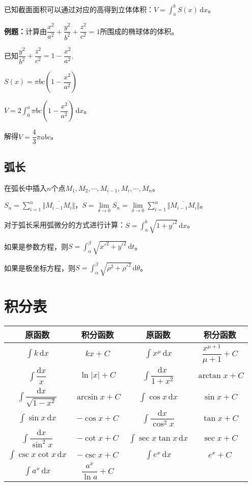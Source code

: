 \documentclass[UTF8, 12pt]{ctexart}
\begin{document}
已知截面面积可以通过对应的高得到立体体积：$V=\int_a^bS(x)\,\textrm{d}x$。

\textbf{例题：}计算由$\dfrac{x^2}{a^2}+\dfrac{y^2}{b^2}+\dfrac{z^2}{c^2}=1$所围成的椭球体的体积。

已知$\dfrac{y^2}{b^2}+\dfrac{z^2}{c^2}=1-\dfrac{x^2}{a^2}$.

$S(x)=\pi bc\left(1-\dfrac{x^2}{a^2}\right)$

$V=2\int_0^a\pi bc\left(1-\dfrac{x^2}{a^2}\right)\,\textrm{d}x$。

解得$V=\dfrac{4}{3}\pi abc$。

\subsection{弧长}

在弧长中插入$n$个点$M_1,M_2,\cdots,M_{i-1},M_i,\cdots,M_n$。

$S_n=\sum\limits_{i=1}^n\Vert\overline{M_{i-1}M_{i}}\Vert$，$S=\lim\limits_{\delta\to 0}S_n=\lim\limits_{\delta\to 0}\sum\limits_{i=1}^n\Vert\overline{M_{i-1}M_{i}}\Vert$。

对于弧长采用弧微分的方式进行计算：$S=\int_a^b\sqrt{1+y'^2}\,\textrm{d}x$。

如果是参数方程，则$S=\int_\alpha^\beta\sqrt{x'^2+y'^2}\,\textrm{d}t$。

如果是极坐标方程，则$S=\int_\alpha^\beta\sqrt{\rho^2+\rho'^2}\,\textrm{d}\theta$。

\section{积分表}

\begin{center}
    \begin{tabular}{|c|c|c|c|}
        \hline
        原函数 & 积分函数 & 原函数 & 积分函数\\ \hline
        $\int k\,\textrm{d}x$ & $kx+C$ & $\int x^\mu\,\textrm{d}x$ & $\dfrac{x^{\mu+1}}{\mu+1}+C$ \\ \hline
        $\int\dfrac{\textrm{d}x}{x}$ & $\ln\vert x\vert+C$ & $\int\dfrac{\textrm{d}x}{1+x^2}$ & $\arctan x+C$ \\ \hline
        $\int\dfrac{\textrm{d}x}{\sqrt{1-x^2}}$ & $\arcsin x+C$ & $\int\cos x\,\textrm{d}x$ & $\sin x+C$ \\ \hline
        $\int\sin x\,\textrm{d}x$ & $-\cos x+C$ & $\int\dfrac{\textrm{d}x}{\cos^2x}$ & $\tan x+C$ \\ \hline
        $\int\dfrac{\textrm{d}x}{\sin^2x}$ & $-\cot x+C$ & $\int\sec x\tan x\,\textrm{d}x$ & $\sec x+C$ \\ \hline
        $\int\csc x\cot x\,\textrm{d}x$ & $-\csc x+C$ & $\int e^x\,\textrm{d}x$ & $e^x+C$ \\ \hline
        $\int a^x\,\textrm{d}x$ & $\dfrac{a^x}{\ln a}+C$ & & \\
        \hline
    \end{tabular}
\end{center}
\end{document}

